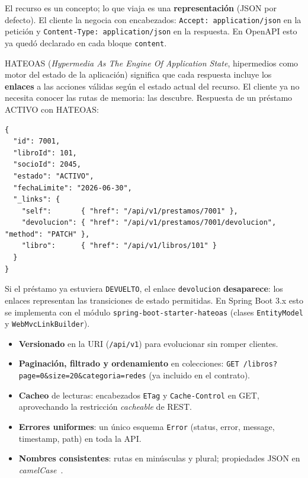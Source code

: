 \documentclass[11pt,a4paper]{article}
\begin{document}
\begin{cajapaso}
El recurso es un concepto; lo que viaja es una \textbf{representación} (JSON por defecto). El cliente la negocia con encabezados: \texttt{Accept: application/json} en la petición y \texttt{Content-Type: application/json} en la respuesta. En OpenAPI esto ya quedó declarado en cada bloque \texttt{content}.
\end{cajapaso}

\begin{cajapaso}
HATEOAS (\textit{Hypermedia As The Engine Of Application State}, hipermedios como motor del estado de la aplicación) significa que cada respuesta incluye los \textbf{enlaces} a las acciones válidas según el estado actual del recurso. El cliente ya no necesita conocer las rutas de memoria: las descubre. Respuesta de un préstamo ACTIVO con HATEOAS:
\begin{lstlisting}[numbers=none]
{
  "id": 7001,
  "libroId": 101,
  "socioId": 2045,
  "estado": "ACTIVO",
  "fechaLimite": "2026-06-30",
  "_links": {
    "self":       { "href": "/api/v1/prestamos/7001" },
    "devolucion": { "href": "/api/v1/prestamos/7001/devolucion", "method": "PATCH" },
    "libro":      { "href": "/api/v1/libros/101" }
  }
}
\end{lstlisting}
Si el préstamo ya estuviera \texttt{DEVUELTO}, el enlace \texttt{devolucion} \textbf{desaparece}: los enlaces representan las transiciones de estado permitidas. En Spring Boot 3.x esto se implementa con el módulo \texttt{spring-boot-starter-hateoas} (clases \texttt{EntityModel} y \texttt{WebMvcLinkBuilder}).
\end{cajapaso}

\begin{cajapaso}
\begin{itemize}
  \item \textbf{Versionado} en la URI (\texttt{/api/v1}) para evolucionar sin romper clientes.
  \item \textbf{Paginación, filtrado y ordenamiento} en colecciones: \texttt{GET /libros?page=0\&size=20\&categoria=redes} (ya incluido en el contrato).
  \item \textbf{Cacheo} de lecturas: encabezados \texttt{ETag} y \texttt{Cache-Control} en GET, aprovechando la restricción \textit{cacheable} de REST.
  \item \textbf{Errores uniformes}: un único esquema \texttt{Error} (status, error, message, timestamp, path) en toda la API.
  \item \textbf{Nombres consistentes}: rutas en minúsculas y plural; propiedades JSON en \textit{camelCase}~\cite{masse2011}.
\end{itemize}
\end{cajapaso}
\end{document}
